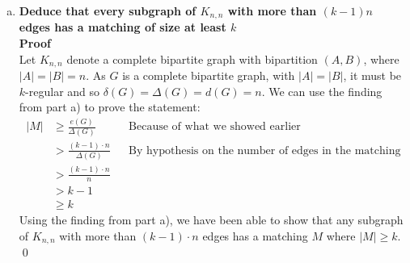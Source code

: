 \begin{enumerate}[a)]
    \boldmath
    \item \textbf{Deduce that every subgraph of $K_{n,n}$ with more than $(k-1)n$ edges has a matching of size at least $k$}
    \unboldmath \\
    \linebreak
    \textbf{Proof} \\
    Let $K_{n, n}$ denote a complete bipartite graph with bipartition $(A, B)$, where $|A| = |B| = n$. As $G$ is a complete bipartite graph, with $|A| = |B|$, it must be $k$-regular and so $\delta(G) = \Delta(G) = d(G) = n$. We can use the finding from part a) to prove the statement:
    \begin{align*}
        |M| &\geq \frac{e(G)}{\Delta(G)} &&\text{Because of what we showed earlier}\\
            & > \frac{(k - 1) \cdot n}{\Delta(G)} &&\text{By hypothesis on the number of edges in the matching}\\
            & > \frac{(k - 1) \cdot n}{n}\\
            & > k - 1 \\
            & \geq k
    \end{align*}
    Using the finding from part a), we have been able to show that any subgraph of $K_{n,n}$ with more than $(k-1)\cdot n$ edges has a matching $M$ where $|M| \geq k$. \qed
\end{enumerate}